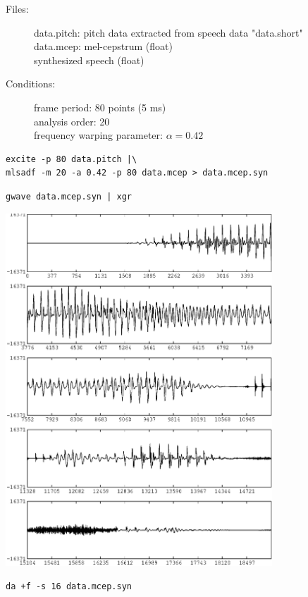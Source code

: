 \documentclass[a4paper,10pt]{article}
\begin{document}
\begin{description}
\item[Files:]
  data.pitch: pitch data extracted from speech data "data.short"\\
  data.mcep: mel-cepstrum (float) \\
  synthesized speech (float)
\item[Conditions:]
  frame period: 80 points (5 ms)\\
  analysis order: 20\\
  frequency warping parameter: $\alpha = 0.42$
\end{description}

\begin{verbatim}
excite -p 80 data.pitch |\
mlsadf -m 20 -a 0.42 -p 80 data.mcep > data.mcep.syn
\end{verbatim}

\begin{verbatim}
gwave data.mcep.syn | xgr
\end{verbatim}

\includegraphics[width=10cm]{data.mcep.syn.gwave.eps}

\begin{verbatim}
da +f -s 16 data.mcep.syn
\end{verbatim}
\end{document}
